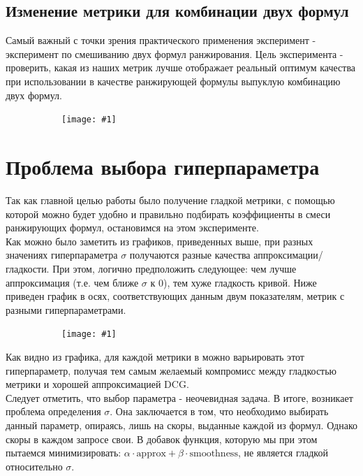 \documentclass[14pt,a4paper]{amsart}
\theoremstyle{definition}
\theoremstyle{definition}
\renewcommand\i{\textit}
\renewcommand\t{\text}
\newcommand{\incpic}[1]{
\begin{figure}[!h]
    \centering
    \begin{subfigure}{\textwidth}
    \centering
        \texttt{[image: \#1]}
    \end{subfigure}
\end{figure}
}
\begin{document}

\subsection{Изменение метрики для комбинации двух формул}

Самый важный с точки зрения практического применения эксперимент - эксперимент по смешиванию двух формул ранжирования. Цель эксперимента - проверить, какая из наших метрик лучше отображает реальный оптимум качества при использовании в качестве ранжирующей формулы выпуклую комбинацию двух формул.

\incpic{fair_formula_mix}


\newpage
\section{Проблема выбора гиперпараметра}

Так как главной целью работы было получение гладкой метрики, с помощью которой можно будет удобно и правильно подбирать коэффициенты в смеси ранжирующих формул, остановимся на этом эксперименте. \\

Как можно было заметить из графиков, приведенных выше, при разных значениях гиперпараметра $\sigma$ получаются разные качества аппроксимации/гладкости. При этом, логично предположить следующее: чем лучше аппроксимация (т.е. чем ближе $\sigma$ к 0), тем хуже гладкость кривой. Ниже приведен график в осях, соответствующих данным двум показателям, метрик с разными гиперпараметрами.

\incpic{tradeoff_max_min}

Как видно из графика, для каждой метрики в можно варьировать этот гиперпараметр, получая тем самым желаемый компромисс между гладкостью метрики и хорошей аппроксимацией DCG. \\

Следует отметить, что выбор параметра - неочевидная задача. В итоге, возникает проблема определения $\sigma$. Она заключается в том, что необходимо выбирать данный параметр, опираясь, лишь на скоры, выданные каждой из формул. Однако скоры в каждом запросе свои. В добавок функция, которую мы при этом пытаемся минимизировать: 
\i{$\alpha \cdot \t{approx} + \beta \cdot \t{smoothness}$}, не является гладкой  относительно $\sigma$. \\
\end{document}
